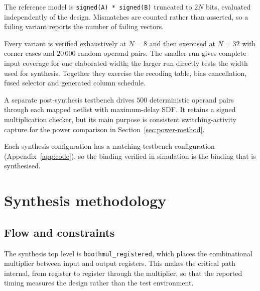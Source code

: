\documentclass[11pt,a4paper]{article}
\begin{document}
The reference model is \texttt{signed(A) * signed(B)} truncated to $2N$ bits,
evaluated independently of the design. Mismatches are counted rather than
asserted, so a failing variant reports the number of failing vectors.

Every variant is verified exhaustively at $N=8$ and then exercised at $N=32$
with corner cases and $20\,000$ random operand pairs. The smaller run gives
complete input coverage for one elaborated width; the larger run directly tests
the width used for synthesis. Together they exercise the recoding table, bias
cancellation, fused selector and generated column schedule.

A separate post-synthesis testbench drives $500$ deterministic operand pairs
through each mapped netlist with maximum-delay SDF. It retains a signed
multiplication checker, but its main purpose is consistent switching-activity
capture for the power comparison in Section~\ref{sec:power-method}.

Each synthesis configuration has a matching testbench configuration
(Appendix~\ref{app:code}), so the binding verified in simulation is the binding
that is synthesised.

\section{Synthesis methodology}
\label{sec:method}

\subsection{Flow and constraints}

The synthesis top level is \texttt{boothmul\_registered}, which places the
combinational multiplier between input and output registers. This makes the
critical path internal, from register to register through the multiplier, so
that the reported timing measures the design rather than the test environment.
\end{document}
